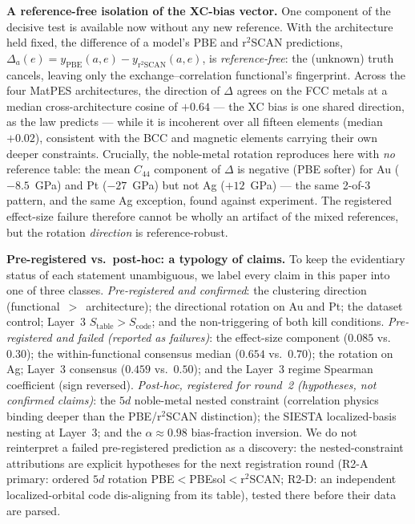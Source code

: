 \documentclass[11pt]{article}
\theoremstyle{remark}
\begin{document}
\textbf{A reference-free isolation of the XC-bias vector.} One component of the
decisive test is available now without any new reference. With the architecture
held fixed, the difference of a model's PBE and r$^2$SCAN predictions,
$\Delta_a(e) = y_{\mathrm{PBE}}(a,e) - y_{\mathrm{r}^2\mathrm{SCAN}}(a,e)$, is
\emph{reference-free}: the (unknown) truth cancels, leaving only the
exchange--correlation functional's fingerprint. Across the four MatPES
architectures, the direction of $\Delta$ agrees on the FCC metals at a median
cross-architecture cosine of $+0.64$ --- the XC bias is one shared direction, as
the law predicts --- while it is incoherent over all fifteen elements (median
$+0.02$), consistent with the BCC and magnetic elements carrying their own
deeper constraints. Crucially, the noble-metal rotation reproduces here with
\emph{no} reference table: the mean $C_{44}$ component of $\Delta$ is negative
(PBE softer) for Au ($-8.5$~GPa) and Pt ($-27$~GPa) but not Ag ($+12$~GPa) ---
the same 2-of-3 pattern, and the same Ag exception, found against experiment.
The registered effect-size failure therefore cannot be wholly an artifact of the
mixed references, but the rotation \emph{direction} is reference-robust.

\textbf{Pre-registered vs.\ post-hoc: a typology of claims.} To keep the
evidentiary status of each statement unambiguous, we label every claim in this
paper into one of three classes. \emph{Pre-registered and confirmed}: the
clustering direction (functional~$>$~architecture); the directional rotation on
Au and Pt; the dataset control; Layer~3 $S_{\mathrm{table}}>S_{\mathrm{code}}$;
and the non-triggering of both kill conditions. \emph{Pre-registered and failed
(reported as failures)}: the effect-size component ($0.085$ vs.\ $0.30$); the
within-functional consensus median ($0.654$ vs.\ $0.70$); the rotation on Ag;
Layer~3 consensus ($0.459$ vs.\ $0.50$); and the Layer~3 regime Spearman
coefficient (sign reversed). \emph{Post-hoc, registered for round~2 (hypotheses,
not confirmed claims)}: the $5d$ noble-metal nested constraint (correlation
physics binding deeper than the PBE/r$^2$SCAN distinction); the SIESTA
localized-basis nesting at Layer~3; and the $\alpha{\approx}0.98$ bias-fraction
inversion. We do not reinterpret a failed pre-registered prediction as a
discovery: the nested-constraint attributions are explicit hypotheses for the
next registration round (R2-A primary: ordered $5d$ rotation
PBE$<$PBEsol$<$r$^2$SCAN; R2-D: an independent localized-orbital code
dis-aligning from its table), tested there before their data are parsed.
\end{document}
